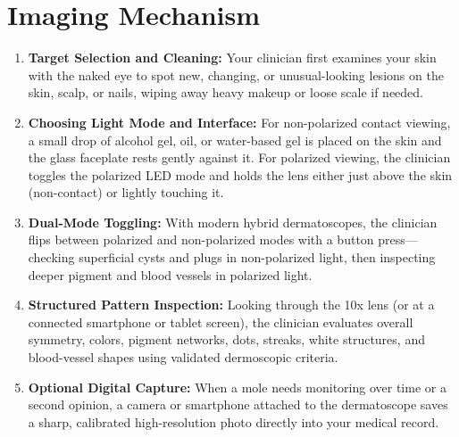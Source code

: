 \section{Imaging Mechanism}
\begin{enumerate}
\item \textbf{Target Selection and Cleaning:} Your clinician first examines your skin with the naked eye to spot new, changing, or unusual-looking lesions on the skin, scalp, or nails, wiping away heavy makeup or loose scale if needed.
\item \textbf{Choosing Light Mode and Interface:} For non-polarized contact viewing, a small drop of alcohol gel, oil, or water-based gel is placed on the skin and the glass faceplate rests gently against it. For polarized viewing, the clinician toggles the polarized LED mode and holds the lens either just above the skin (non-contact) or lightly touching it.
\item \textbf{Dual-Mode Toggling:} With modern hybrid dermatoscopes, the clinician flips between polarized and non-polarized modes with a button press---checking superficial cysts and plugs in non-polarized light, then inspecting deeper pigment and blood vessels in polarized light.
\item \textbf{Structured Pattern Inspection:} Looking through the 10x lens (or at a connected smartphone or tablet screen), the clinician evaluates overall symmetry, colors, pigment networks, dots, streaks, white structures, and blood-vessel shapes using validated dermoscopic criteria.
\item \textbf{Optional Digital Capture:} When a mole needs monitoring over time or a second opinion, a camera or smartphone attached to the dermatoscope saves a sharp, calibrated high-resolution photo directly into your medical record.
\end{enumerate}

